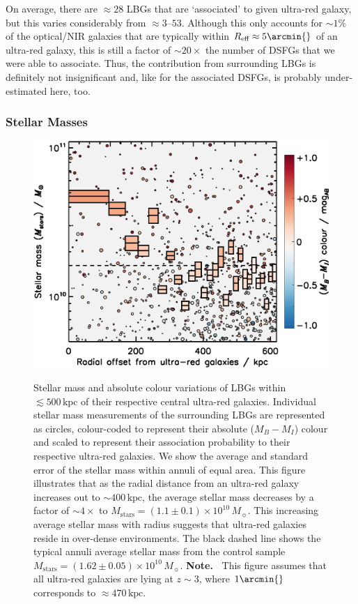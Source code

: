 \documentclass[a4paper, fleqn, usenatbib]{mnras}
\newcommand{\kiloparsec}{\text{kpc}}
\newcommand{\msol}{M_{\sun}}
\newcommand{\mstars}{M_{\text{stars}}}
\newcommand{\reff}{R_{\text{eff}}}
\newcommand{\urg}{ultra-red galaxy}
\newcommand{\urgs}{ultra-red galaxies}
\begin{document}
On average, there are $\approx28$ LBGs that are `associated' to given \urg{}, but this varies considerably from $\approx3\text{--}53$.
Although this only accounts for $\sim1\%$ of the optical/NIR galaxies that are typically within $\reff{}\approx5\arcmin{}$ of an \urg{}, this is still a factor of $\sim20\times$ the number of DSFGs that we were able to associate.
Thus, the contribution from surrounding LBGs is definitely not insignificant and, like for the associated DSFGs, is probably under-estimated here, too.

\subsubsection{Stellar Masses}

\begin{figure}
    \includegraphics[width=1.25\columnwidth]{stellar_mass}\\
    \caption{Stellar mass and absolute colour variations of LBGs within $\lesssim500\,\kiloparsec{}$ of their respective central \urgs{}.
    Individual stellar mass measurements of the surrounding LBGs are represented as circles, colour-coded to represent their absolute ($M_{B}-M_{I}$) colour and scaled to represent their association probability to their respective \urgs{}.
    We show the average and standard error of the stellar mass within annuli of equal area.
    This figure illustrates that as the radial distance from an \urg{} increases out to $\sim400\,\kiloparsec{}$, the average stellar mass decreases by a factor of $\sim4\times$ to $\mstars{}=(1.1\pm0.1)\times10^{10}\,\msol{}$.
    This increasing average stellar mass with radius suggests that \urgs{} reside in over-dense environments.
    The black dashed line shows the typical annuli average stellar mass from the control sample $\mstars{}=(1.62\pm0.05)\times10^{10}\,\msol{}$.
    \textbf{Note.\ } This figure assumes that all \urgs{} are lying at $z\sim3$, where $1\arcmin{}$ corresponds to $\approx470\,\kiloparsec{}$.}
    \label{fig:stellar_mass}
\end{figure}
\end{document}
